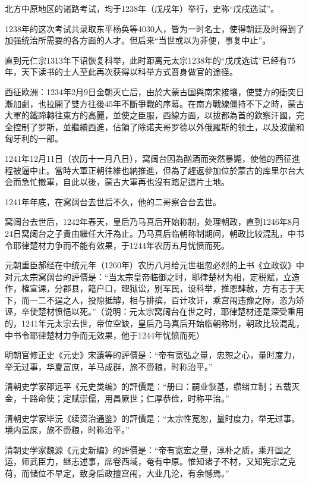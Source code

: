 北方中原地区的诸路考试，均于1238年（戊戌年）举行，史称“戊戌选试”。

1238年的这次考试共录取东平杨奂等4030人，皆为一时名士，使得朝廷及时得到了加强统治所需要的各方面的人才。但后来“当世或以为非便，事复中止”。

直到元仁宗1313年下诏恢复科举，此时距离元太宗1238年的“戊戌选试”已经有75年，天下读书的士人至此再次获得以科举方式晋身做官的途径。

西征欧洲：1234年2月9日金朝灭亡后，由於大蒙古国與南宋接壤，使雙方的衝突日漸加劇，也拉開了雙方往後45年不斷爭戰的序幕。在南方戰線僵持不下之時，蒙古大軍的鐵蹄轉往東方的高麗，並使之臣服，西線方面，以拔都為首的欽察汗國，完全控制了罗斯，並繼續西進，佔領了除诺夫哥罗德以外俄羅斯的领土，以及波蘭和匈牙利的一部。

1241年12月11日（农历十一月八日），窝阔台因為酗酒而突然暴斃，使他的西征進程被逼中止。當時大軍正朝往維也納推進，但為了趕返參加位於蒙古的库里尔台大会而急忙撤軍，自此以後，蒙古大軍再也沒有踏足這片土地。

1241年年底，在窝阔台去世后不久，他的二哥察合台去世。

窝阔台去世后，1242年春天，皇后乃马真后开始称制，处理朝政，直到1246年8月24日窝阔台之子貴由繼任大汗為止。乃马真后临朝称制期间，朝政比较混乱，中书令耶律楚材力争而不能有效果，于1244年农历五月忧愤而死。

元朝重臣郝经在中统元年（1260年）农历八月给元世祖忽必烈的上书《立政议》中对元太宗窝阔台的評價是：“当太宗皇帝临御之时，耶律楚材为相，定税赋，立造作，榷宣课，分郡县，籍户口，理狱讼，别军民，设科举，推恩肆赦，方有志于天下，而一二不逞之人，投隙抵罅，相与排摈，百计攻讦，乘宫闱违豫之际，恣为矫诬，卒使楚材愤悒以死。”（说明：元太宗窝阔台在世之时，耶律楚材还是深受重用的，1241年元太宗去世，帝位空缺，皇后乃马真后开始临朝称制，朝政比较混乱，中书令耶律楚材力争而无效果，他于1244年忧愤而死）

明朝官修正史《元史》宋濂等的評價是：“帝有宽弘之量，忠恕之心，量时度力，举无过事，华夏富庶，羊马成群，旅不赍粮，时称治平。”

清朝史学家邵远平《元史类编》的評價是：“册曰：嗣业恢基，缵绪立制；五载灭金，十路命使；定赋崇儒，用昌厥世；仁厚恭俭，时称平治。”

清朝史学家毕沅《续资治通鉴》的評價是：“太宗性宽恕，量时度力，举无过事。境内富庶，旅不赍粮，时称治平。”

清朝史学家魏源《元史新编》的評價是：“帝有宽宏之量，淳朴之质，乘开国之运，师武臣力，继志述事，席卷西域，奄有中原。惟知诸子不材，又知宪宗之克荷，而储位不早定，致身后政擅宫闱，大业几沦，有余憾焉。”

